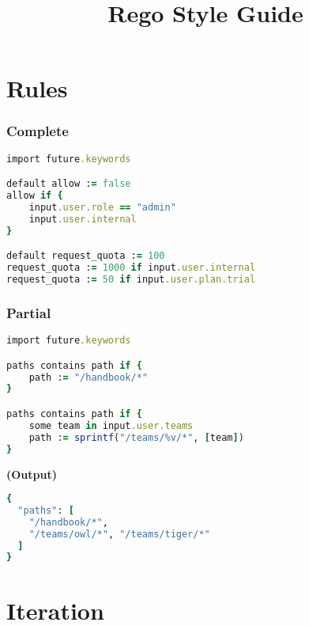 \documentclass[twocolumn]{article}
\makeatletter
\renewcommand{\maketitle}{\bgroup\setlength{\parindent}{0pt}
  \textbf{\LARGE{\@title}}
}
\makeatother
\begin{document}
\title{Rego Style Guide}

\maketitle
\vspace{-1em}


\section*{Rules}




\vspace{-1em}
\subsubsection*{Complete}

\begin{lstlisting}[language=Ruby]
import future.keywords

default allow := false
allow if {
	input.user.role == "admin"
	input.user.internal
}

default request_quota := 100
request_quota := 1000 if input.user.internal
request_quota := 50 if input.user.plan.trial
\end{lstlisting}





\vspace{-1em}
\subsubsection*{Partial}

\begin{lstlisting}[language=Ruby]
import future.keywords

paths contains path if {
	path := "/handbook/*"
}

paths contains path if {
	some team in input.user.teams
	path := sprintf("/teams/%v/*", [team])
}
\end{lstlisting}



\textbf{\tiny{(Output)}}
\begin{lstlisting}[language=Ruby]
{
  "paths": [
    "/handbook/*",
    "/teams/owl/*", "/teams/tiger/*"
  ]
}
\end{lstlisting}




\section*{Iteration}
\end{document}
